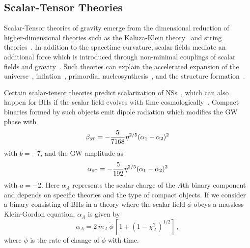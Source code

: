 \documentclass[prd,twocolumn,nofootinbib]{revtex4-1}
\newcommand\be{\begin{equation}}
\newcommand\ee{\end{equation}}
\newcommand{\ST}{{\mbox{\tiny ST}}}
\begin{document}
\subsection{Scalar-Tensor Theories}
Scalar-Tensor theories of gravity emerge from the dimensional reduction of higher-dimensional theories such as the Kaluza-Klein theory~\cite{Fujii:2003pa,Overduin:1998pn} and string theories~\cite{polchinski1,polchinski2}. In addition to the spacetime curvature, scalar fields mediate an additional force which is introduced through non-minimal couplings of scalar fields and gravity~\cite{Berti:2015itd,Chiba:1997ms,PhysRevD.6.2077}. Such theories can explain the accelerated expansion of the universe~\cite{Brax:2004qh,PhysRevD.73.083510,PhysRevD.62.123510,PhysRevD.66.023525,Schimd:2004nq}, inflation~\cite{Burd:1991ns,Barrow:1990nv,Clifton:2011jh}, primordial nucleosynthesis~\cite{Coc:2006rt,Damour:1998ae,Larena:2005tu,Torres:1995je}, and the structure formation~\cite{Brax:2005ew}. 

Certain scalar-tensor theories predict scalarization of NSs~\cite{PhysRevLett.70.2220,Barausse:2012da}, which can also happen for BHs if the scalar field evolves with time cosmologically~\cite{Jacobson:1999vr,Horbatsch:2011ye}. Compact binaries formed by such objects emit dipole radiation which modifies the GW phase with~\cite{Freire:2012mg,Wex:2014nva,Tahura:2018zuq}
\be\label{eq:betaST}
\beta_{\ST}=-\frac{5}{7168}\eta ^{2/5}(\alpha_1-\alpha_2)^2
\ee
with $b=-7$, and the GW amplitude as~\cite{Tahura:2018zuq}
\be\label{eq:alphaST}
\alpha_{\ST}=-\frac{5}{192}\eta ^{2/5}(\alpha_1-\alpha_2)^2
\ee
with $a=-2$. Here $\alpha_A$ represents the scalar charge of the $A$th binary component and depends on specific theories and the type of compact objects. If we consider a binary consisting of BHs in a theory where the scalar field $\phi$ obeys a massless Klein-Gordon equation, $\alpha_A$ is given by~\cite{Horbatsch:2011ye}
\be\label{eq:alpha_A}
\alpha_A = 2 \, m_A \, \dot \phi\, [1+(1-\chi_A^2)^{1/2}]\,,
\ee
where $\dot{\phi}$ is the rate of change of $\phi$ with time.
\end{document}
